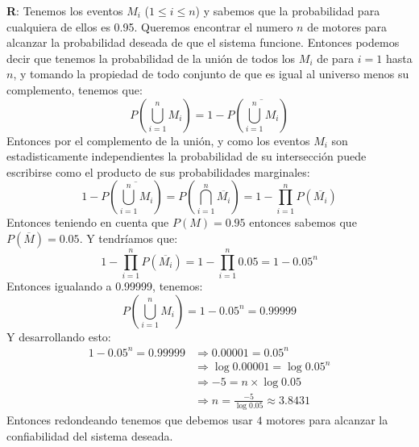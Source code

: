 \documentclass{article}
\newcommand{\prob}[1]{{P} \left( {#1} \right)}
\begin{document}
\vspace{0.4cm}

\textbf{R}: Tenemos los eventos $M_{i}$ ($1 \leq i \leq n$) y sabemos que la probabilidad para cualquiera de ellos es 0.95.
Queremos encontrar el numero $n$ de motores para alcanzar la probabilidad deseada de que el sistema funcione. Entonces podemos decir que
tenemos la probabilidad de la unión de todos los $M_{i}$ de para $i = 1$ hasta $n$, y tomando la propiedad de todo conjunto de que es igual al universo menos su complemento, tenemos que:
\begin{equation*}
	\prob{ \bigcup\limits_{i=1}^{n} M_{i} } = 1 - \prob{ \overline{ \bigcup\limits_{i=1}^{n} M_{i} } }
\end{equation*}
Entonces por el complemento de la unión, y como los eventos $M_{i}$ son estadisticamente independientes la probabilidad de su intersección
puede escribirse como el producto de sus probabilidades marginales:
\begin{equation*}
1 - \prob{ \overline{ \bigcup\limits_{i=1}^{n} M_{i} } } = 
\prob{ \bigcap\limits_{i=1}^{n} \overline{M_{i}} } = 
1 - \prod_{i=1}^{n} \prob{ \overline{ M_{i} } }
\end{equation*}
Entonces teniendo en cuenta que $\prob{M} = 0.95$ entonces sabemos que $\prob{ \overline{M} } = 0.05$. Y tendríamos que:
\begin{equation*}
	1 - \prod_{i=1}^{n} \prob{ \overline{ M_{i} } } = 
	1 - \prod_{i=1}^{n} 0.05 =
	1 - 0.05^{n}
\end{equation*}
Entonces igualando a 0.99999, tenemos:
\begin{equation*}
	\prob{ \bigcup\limits_{i=1}^{n} M_{i} } = 1 - 0.05^{n} = 0.99999
\end{equation*}
Y desarrollando esto:
\begin{align*}
	1 - 0.05^{n} = 0.99999 & \Rightarrow 0.00001 = 0.05^{n} \\
	& \Rightarrow \log{0.00001} = \log{0.05^{n}} \\
	& \Rightarrow -5 = n \times \log{0.05} \\
	& \Rightarrow n = \frac{-5}{\log{0.05}} \approx 3.8431
\end{align*}
Entonces redondeando tenemos que debemos usar $4$ motores para alcanzar la confiabilidad del sistema deseada.


\newpage
\end{document}
